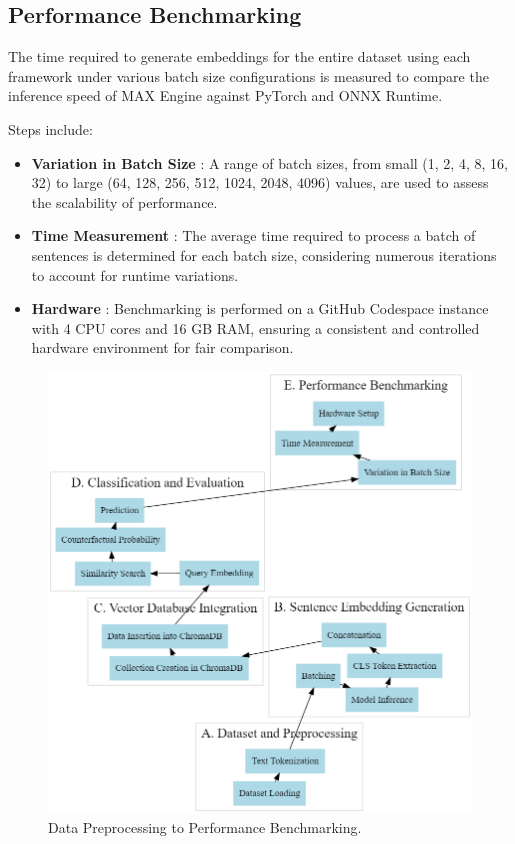 \documentclass[conference]{IEEEtran}
\begin{document}
\subsection{Performance Benchmarking}
The time required to generate embeddings for the entire dataset using each framework under various batch size configurations is measured to compare the inference speed of MAX Engine against PyTorch and ONNX Runtime.

Steps include:
\begin{itemize}
    \item \textbf{Variation in Batch Size} : A range of batch sizes, from small (1, 2, 4, 8, 16, 32) to large (64, 128, 256, 512, 1024, 2048, 4096) values, are used to assess the scalability of performance.
    \item \textbf{Time Measurement} : The average time required to process a batch of sentences is determined for each batch size, considering numerous iterations to account for runtime variations.
    \item \textbf{Hardware} : Benchmarking is performed on a GitHub Codespace instance with 4 CPU cores and 16 GB RAM, ensuring a consistent and controlled hardware environment for fair comparison.
\end{itemize}

\begin{figure}[h]
    \centerline{\includegraphics[width=\linewidth]{2.png}}
    \caption{Data Preprocessing to Performance Benchmarking.}
    \label{fig2}
\end{figure}
\end{document}
